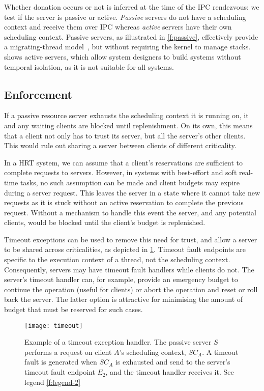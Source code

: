 Whether donation occurs or not is inferred at the time of the IPC rendezvous: we test if the
server is passive or active. 
\emph{Passive} servers do not have a scheduling context 
and receive them over \gls{IPC} whereas \emph{active} servers have their own scheduling context. 
Passive servers, as illustrated in \cref{f:passive}, effectively provide a migrating-thread
model~\citep{Ford_Lepreau_94, Gabber_SBBS_99}, but without requiring
the kernel to manage stacks.  shows active servers, which allow system designers to
build systems without temporal isolation, as it is not suitable
for all systems.

\subsection{Enforcement}

If a passive resource server exhausts the scheduling context it is running on, it and any waiting clients
are blocked until replenishment. On its own, this means that a client
not only has to trust its server, but all the server's other
clients. This would rule out sharing a server between clients of
different criticality.

In a \gls{HRT} system, we can assume that a client's reservations are sufficient to complete
requests to servers.  However, in systems with best-effort and soft real-time tasks, no such
assumption can be made and client budgets may expire during a server request.  This leaves the
server in a state where it cannot take new requests as it is stuck without an active reservation to
complete the previous request.  Without a mechanism to handle this event the server, and any
potential clients, would be blocked until the client's budget is replenished.

Timeout exceptions can be used to remove this need for trust, and
allow a server to be shared across criticalities, as depicted in \cref{f:timeout}. Timeout fault endpoints are specific to the
execution context of a thread, not the scheduling context. Consequently, servers may have timeout
fault handlers while clients do not. The 
server's timeout handler can, for example, provide an emergency budget
to continue the operation (useful for  clients) or abort
the operation and reset or roll back the server. The latter option is
attractive for minimising the amount of budget that must be reserved
for such cases.

\begin{figure}
    \centering
    \texttt{[image: timeout]}
    \caption{Example of a timeout exception handler. The passive server $S$ performs a request on
    client $A$'s scheduling context, $SC_{A}$. A timeout fault is generated when $SC_{A}$ is
exhausted and send to the server's timeout fault endpoint $E_{2}$, and the timeout handler receives
it. See legend \cref{f:legend-2}}
    \label{f:timeout}
\end{figure}


